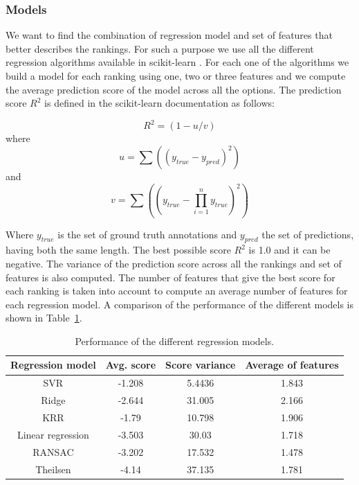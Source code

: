\documentclass{article}
\begin{document}
\subsubsection{Models}
We want to find the combination of regression model and set of features that better describes the rankings. For such a purpose we use all the different regression algorithms available in scikit-learn \cite{08}.  For each one of the algorithms we build a model for each ranking using one, two or three features and we compute the average prediction score of the model across all the options. The prediction score $R^2$ is defined in the scikit-learn documentation as follows:

\begin{equation}
 R^2 = (1 - u/v) 
\end{equation}
where
\begin{equation}
	u = \sum\nolimits((y_{true} - y_{pred})^2)
\end{equation}
and
\begin{equation}
	v = \sum\nolimits((y_{true} - \prod\limits_{i=1}^n y_{true})^2)
\end{equation}

Where $y_{true}$ is the set of ground truth annotations and $y_{pred}$ the set of predictions, having both the same length. The best possible score $R^2$ is 1.0 and it can be negative.
The variance of the prediction score across all the rankings and set of features is also computed. 
The number of features that give the best score for each ranking is taken into account to compute an average number of features for each regression model. A comparison of the performance of the different models is shown in Table~\ref{models}.

\begin{table}[ht]
\centering
\label{my-label}
\begin{tabular}{cccc}
\hline
Regression model  & Avg. score & Score variance & Average of features \\ \hline
SVR               & -1.208     & 5.4436         & 1.843               \\
Ridge             & -2.644     & 31.005         & 2.166               \\
KRR               & -1.79      & 10.798         & 1.906               \\
Linear regression & -3.503     & 30.03          & 1.718               \\
RANSAC            & -3.202     & 17.532         & 1.478               \\
Theilsen          & -4.14      & 37.135         & 1.781               \\ \hline
\end{tabular}
\caption{Performance of the different regression models.}
\label{models}
\end{table}
\end{document}
